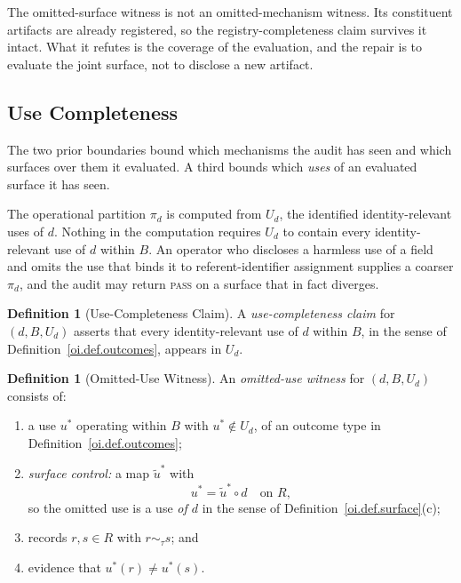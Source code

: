 \documentclass[11pt]{article}
\theoremstyle{plain}
\theoremstyle{definition}
\newtheorem{definition}[theorem]{Definition}
\theoremstyle{remark}
\newcommand{\PASS}{\textnormal{\textsc{pass}}}
\begin{document}
The omitted-surface witness is not an omitted-mechanism witness.
Its constituent artifacts are already registered,
so the registry-completeness claim survives it intact.
What it refutes is the coverage of the evaluation,
and the repair is to evaluate the joint surface,
not to disclose a new artifact.

\subsection{Use Completeness}

The two prior boundaries bound which mechanisms the audit has seen
and which surfaces over them it evaluated.
A third bounds which \emph{uses} of an evaluated surface it has seen.

The operational partition \(\pi_d\) is computed from \(U_d\),
the identified identity-relevant uses of \(d\).
Nothing in the computation requires \(U_d\)
to contain every identity-relevant use of \(d\) within \(B\).
An operator who discloses a harmless use of a field
and omits the use that binds it to referent-identifier assignment
supplies a coarser \(\pi_d\),
and the audit may return \PASS{} on a surface that in fact diverges.

\begin{definition}[Use-Completeness Claim]
  \label{oi.def.usecomplete}
  A \emph{use-completeness claim} for \((d,B,U_d)\)
  asserts that every identity-relevant use of \(d\) within \(B\),
  in the sense of Definition~\ref{oi.def.outcomes},
  appears in \(U_d\).
\end{definition}

\begin{definition}[Omitted-Use Witness]
  \label{oi.def.omitteduse}
  An \emph{omitted-use witness} for \((d,B,U_d)\) consists of:
  \begin{enumerate}[label=(\alph*)]
    \item a use \(u^{\ast}\) operating within \(B\)
          with \(u^{\ast}\notin U_d\),
          of an outcome type in Definition~\ref{oi.def.outcomes};
    \item \emph{surface control:} a map \(\tilde{u}^{\ast}\) with
          \[
            u^{\ast}=\tilde{u}^{\ast}\circ d
            \quad\text{on }R,
          \]
          so the omitted use is a use \emph{of \(d\)} in the sense of
          Definition~\ref{oi.def.surface}(c);
    \item records \(r,s\in R\) with \(r\sim_{\tau}s\); and
    \item evidence that \(u^{\ast}(r)\neq u^{\ast}(s)\).
  \end{enumerate}
\end{definition}
\end{document}
